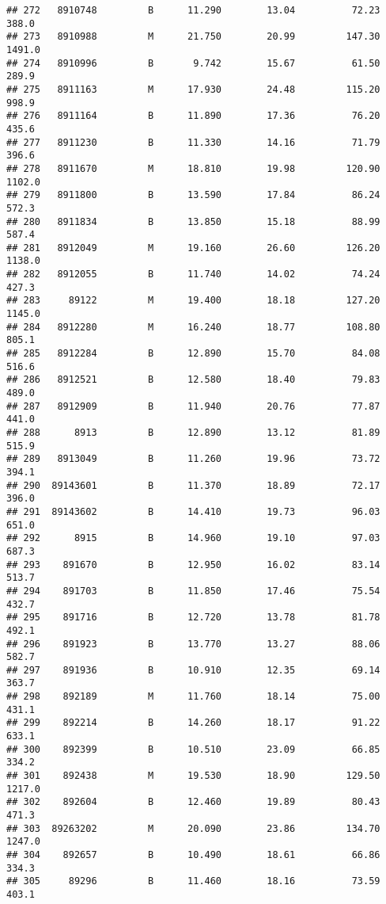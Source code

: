 \documentclass[
]{article}
\begin{document}
\begin{verbatim}
## 272   8910748         B      11.290        13.04          72.23     388.0
## 273   8910988         M      21.750        20.99         147.30    1491.0
## 274   8910996         B       9.742        15.67          61.50     289.9
## 275   8911163         M      17.930        24.48         115.20     998.9
## 276   8911164         B      11.890        17.36          76.20     435.6
## 277   8911230         B      11.330        14.16          71.79     396.6
## 278   8911670         M      18.810        19.98         120.90    1102.0
## 279   8911800         B      13.590        17.84          86.24     572.3
## 280   8911834         B      13.850        15.18          88.99     587.4
## 281   8912049         M      19.160        26.60         126.20    1138.0
## 282   8912055         B      11.740        14.02          74.24     427.3
## 283     89122         M      19.400        18.18         127.20    1145.0
## 284   8912280         M      16.240        18.77         108.80     805.1
## 285   8912284         B      12.890        15.70          84.08     516.6
## 286   8912521         B      12.580        18.40          79.83     489.0
## 287   8912909         B      11.940        20.76          77.87     441.0
## 288      8913         B      12.890        13.12          81.89     515.9
## 289   8913049         B      11.260        19.96          73.72     394.1
## 290  89143601         B      11.370        18.89          72.17     396.0
## 291  89143602         B      14.410        19.73          96.03     651.0
## 292      8915         B      14.960        19.10          97.03     687.3
## 293    891670         B      12.950        16.02          83.14     513.7
## 294    891703         B      11.850        17.46          75.54     432.7
## 295    891716         B      12.720        13.78          81.78     492.1
## 296    891923         B      13.770        13.27          88.06     582.7
## 297    891936         B      10.910        12.35          69.14     363.7
## 298    892189         M      11.760        18.14          75.00     431.1
## 299    892214         B      14.260        18.17          91.22     633.1
## 300    892399         B      10.510        23.09          66.85     334.2
## 301    892438         M      19.530        18.90         129.50    1217.0
## 302    892604         B      12.460        19.89          80.43     471.3
## 303  89263202         M      20.090        23.86         134.70    1247.0
## 304    892657         B      10.490        18.61          66.86     334.3
## 305     89296         B      11.460        18.16          73.59     403.1

\end{verbatim}
\end{document}
